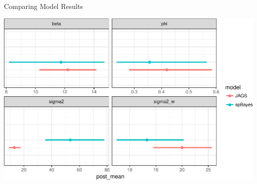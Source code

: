 \documentclass[11pt,ignorenonframetext,]{beamer}
\begin{document}
\begin{frame}{Comparing Model Results}
\protect\hypertarget{comparing-model-results}{}

\begin{center}\includegraphics[width=\textwidth]{Lec19_files/figure-beamer/unnamed-chunk-48-1} \end{center}

\end{frame}
\end{document}
